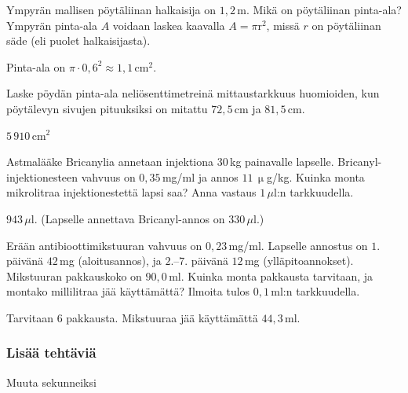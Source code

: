 \begin{tehtavasivu}
\begin{tehtava}
        Ympyrän mallisen pöytäliinan halkaisija on $1,2$\,m.  Mikä on pöytäliinan pinta-ala? Ympyrän pinta-ala $A$ voidaan laskea kaavalla $A=\pi\text{r}^2$, missä $r$ on pöytäliinan säde (eli puolet halkaisijasta).
        \begin{vastaus}
        Pinta-ala on $\pi \cdot 0,6^2 \approx 1,1\,$cm$^2$.
        \end{vastaus}
\end{tehtava}

\begin{tehtava}
Laske pöydän pinta-ala neliösenttimetreinä mittaustarkkuus huomioiden, kun pöytälevyn sivujen pituuksiksi on mitattu $72,5$\,cm ja $81,5$\,cm.
\begin{vastaus}
$5\,910$\,cm$^2$
\end{vastaus}
\end{tehtava}

\begin{tehtava}
Astmalääke Bricanylia annetaan injektiona $30$\,kg painavalle lapselle. Bricanyl-injektionesteen vahvuus on $0,35$\,mg/ml ja annos $11$\,$\upmu$g/kg. Kuinka monta mikrolitraa injektionestettä lapsi saa? Anna vastaus $1$\,$\mu$l:n tarkkuudella. %
 \begin{vastaus}
$943$\,$\mu$l. (Lapselle annettava Bricanyl-annos on $330$\,$\mu$l.) %
 \end{vastaus}
\end{tehtava}

\begin{tehtava}
Erään antibioottimikstuuran vahvuus on $0,23$\,mg/ml. Lapselle annostus on $1.$ päivänä $42$\,mg (aloitusannos), ja $2$.--$7$. päivänä $12$\,mg (ylläpitoannokset). Mikstuuran pakkauskoko on $90,0$\,ml. Kuinka monta pakkausta tarvitaan, ja montako millilitraa jää käyttämättä? Ilmoita tulos $0,1$\,ml:n tarkkuudella.
 \begin{vastaus}
Tarvitaan $6$ pakkausta. Mikstuuraa jää käyttämättä $44,3$\,ml.
 \end{vastaus}
\end{tehtava}

\subsubsection*{Lisää tehtäviä}

\begin{tehtava}
Muuta sekunneiksi
	\begin{vastaus}
	\end{vastaus}
\end{tehtava}


\end{tehtavasivu}
